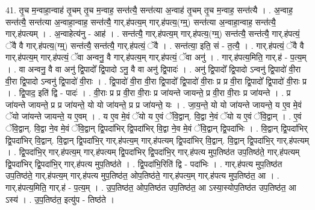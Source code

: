 \documentclass[17pt]{extarticle}
\begin{document}
41. तृ॒च म॒न्वाहा॒न्वाह॑ तृ॒चम् तृ॒च म॒न्वाह॒ सन्त॑त्यै॒ सन्त॑त्या अ॒न्वाह॑ तृ॒चम् तृ॒च म॒न्वाह॒ सन्त॑त्यै । . अ॒न्वाह॒ सन्त॑त्यै॒ सन्त॑त्या अ॒न्वाहा॒न्वाह॒ सन्त॑त्यै॒ गार्.ह॑पत्य॒म् गार्.ह॑पत्य॒(ग्म्॒) सन्त॑त्या अ॒न्वाहा॒न्वाह॒ सन्त॑त्यै॒ गार्.ह॑पत्यम् । . अ॒न्वाहेत्य॑नु - आह॑ । . सन्त॑त्यै॒ गार्.ह॑पत्य॒म् गार्.ह॑पत्य॒(ग्म्॒) सन्त॑त्यै॒ सन्त॑त्यै॒ गार्.ह॑पत्यं॒ ॅवै वै गार्.ह॑पत्य॒(ग्म्॒) सन्त॑त्यै॒ सन्त॑त्यै॒ गार्.ह॑पत्यं॒ ॅवै । . सन्त॑त्या॒ इति॒ सं - त॒त्यै॒ । . गार्.ह॑पत्यं॒ ॅवै वै गार्.ह॑पत्य॒म् गार्.ह॑पत्यं॒ ॅवा अन्वनु॒ वै गार्.ह॑पत्य॒म् गार्.ह॑पत्यं॒ ॅवा अनु॑ । . गार्.ह॑पत्य॒मिति॒ गार्.ह॑ - प॒त्य॒म् । . वा अन्वनु॒ वै वा अनु॑ द्वि॒पादो᳚ द्वि॒पादो ऽनु॒ वै वा अनु॑ द्वि॒पादः॑ । . अनु॑ द्वि॒पादो᳚ द्वि॒पादो ऽन्वनु॑ द्वि॒पादो॑ वी॒रा वी॒रा द्वि॒पादो ऽन्वनु॑ द्वि॒पादो॑ वी॒राः । . द्वि॒पादो॑ वी॒रा वी॒रा द्वि॒पादो᳚ द्वि॒पादो॑ वी॒राः प्र प्र वी॒रा द्वि॒पादो᳚ द्वि॒पादो॑ वी॒राः प्र । . द्वि॒पाद॒ इति॑ द्वि - पादः॑ । . वी॒राः प्र प्र वी॒रा वी॒राः प्र जा॑यन्ते जायन्ते॒ प्र वी॒रा वी॒राः प्र जा॑यन्ते । . प्र जा॑यन्ते जायन्ते॒ प्र प्र जा॑यन्ते॒ यो यो जा॑यन्ते॒ प्र प्र जा॑यन्ते॒ यः । . जा॒य॒न्ते॒ यो यो जा॑यन्ते जायन्ते॒ य ए॒व मे॒वं ॅयो जा॑यन्ते जायन्ते॒ य ए॒वम् । . य ए॒व मे॒वं ॅयो य ए॒वं ॅवि॒द्वान्. वि॒द्वा ने॒वं ॅयो य ए॒वं ॅवि॒द्वान् । . ए॒वं ॅवि॒द्वान्. वि॒द्वा ने॒व मे॒वं ॅवि॒द्वान् द्वि॒पदा॑भिर् द्वि॒पदा॑भिर् वि॒द्वा ने॒व मे॒वं ॅवि॒द्वान् द्वि॒पदा॑भिः । . वि॒द्वान् द्वि॒पदा॑भिर् द्वि॒पदा॑भिर् वि॒द्वान्. वि॒द्वान् द्वि॒पदा॑भि॒र् गार्.ह॑पत्य॒म् गार्.ह॑पत्यम् द्वि॒पदा॑भिर् वि॒द्वान्. वि॒द्वान् द्वि॒पदा॑भि॒र् गार्.ह॑पत्यम् । . द्वि॒पदा॑भि॒र् गार्.ह॑पत्य॒म् गार्.ह॑पत्यम् द्वि॒पदा॑भिर् द्वि॒पदा॑भि॒र् गार्.ह॑पत्य मुप॒तिष्ठ॑त उप॒तिष्ठ॑ते॒ गार्.ह॑पत्यम् द्वि॒पदा॑भिर् द्वि॒पदा॑भि॒र् गार्.ह॑पत्य मुप॒तिष्ठ॑ते । . द्वि॒पदा॑भि॒रिति॑ द्वि - पदा॑भिः । . गार्.ह॑पत्य मुप॒तिष्ठ॑त उप॒तिष्ठ॑ते॒ गार्.ह॑पत्य॒म् गार्.ह॑पत्य मुप॒तिष्ठ॑त॒ ओप॒तिष्ठ॑ते॒ गार्.ह॑पत्य॒म् गार्.ह॑पत्य मुप॒तिष्ठ॑त॒ आ । . गार्.ह॑पत्य॒मिति॒ गार्.ह॑ - प॒त्य॒म् । . उ॒प॒तिष्ठ॑त॒ ओप॒तिष्ठ॑त उप॒तिष्ठ॑त॒ आ ऽस्या॒स्योप॒तिष्ठ॑त उप॒तिष्ठ॑त॒ आ ऽस्य॑ । . उ॒प॒तिष्ठ॑त॒ इत्यु॑प - तिष्ठ॑ते । \newline
\pagebreak
{}
\end{document}
